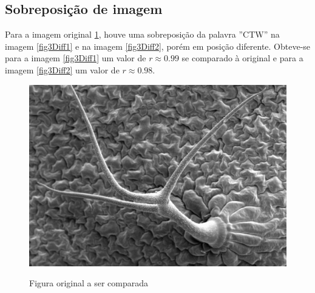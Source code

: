 \documentclass[10pt,a4paper]{article}
\begin{document}
\newpage
\subsection{Sobreposição de imagem}
Para a imagem original \ref{fig3}, houve uma sobreposição da palavra
''CTW'' na imagem \ref{fig3Diff1} e na imagem \ref{fig3Diff2},
porém em posição diferente. Obteve-se para a imagem \ref{fig3Diff1}
um valor de $r\approx 0.99$ se comparado à original e para a imagem \ref{fig3Diff2} 
um valor de $r\approx 0.98$.
\begin{figure}[h!]
  \begin{center}
    \includegraphics[scale=0.25]{photos/m15_tricome}\label{fig3}
    \caption{Figura original a ser comparada}
  \end{center}
\end{figure}
\end{document}
